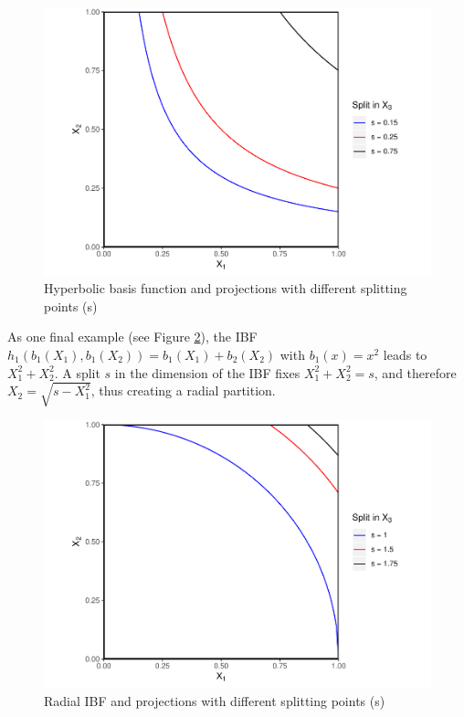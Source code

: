\documentclass[]{elsarticle} %
\makeatletter
\def\maxwidth{\ifdim\Gin@nat@width>\linewidth\linewidth
\else\Gin@nat@width\fi}
\let\Oldincludegraphics\includegraphics
\renewcommand{\includegraphics}[1]{\Oldincludegraphics[width=\maxwidth]{#1}}
\makeatother
\begin{document}
\begin{figure}
\centering
\includegraphics{Trees_with_Base_Functions_v3_files/figure-latex/fig5-hyperbolic-basis-1.pdf}
\caption{\label{fig:fig5-hyperbolic-basis}Hyperbolic basis function and
projections with different splitting points (s)}
\end{figure}

As one final example (see Figure \ref{fig:fig6-radial-basis}), the IBF
\(h_1(b_1(X_1),b_1(X_2))=b_1(X_1)+b_2(X_2)\) with \(b_1(x)=x^2\) leads
to \(X_1^2 + X_2^2\). A split \(s\) in the dimension of the IBF fixes
\(X_1^2 + X_2^2=s\), and therefore \(X_2=\sqrt{s-X_1^2}\), thus creating
a radial partition.

\begin{figure}
\centering
\includegraphics{Trees_with_Base_Functions_v3_files/figure-latex/fig6-radial-basis-1.pdf}
\caption{\label{fig:fig6-radial-basis}Radial IBF and projections with
different splitting points (s)}
\end{figure}
\end{document}
